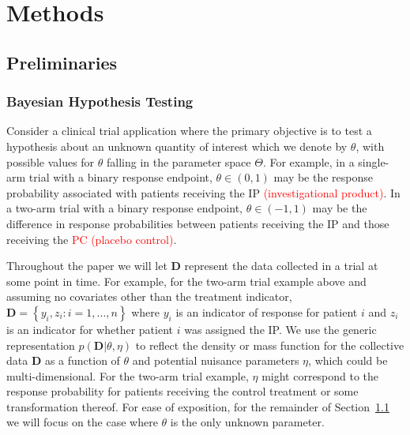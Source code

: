 \documentclass[12pt]{article}
\begin{document}
\section{Methods}\label{sec:methods}

\subsection{Preliminaries}\label{sec:preliminaries}
\subsubsection{Bayesian Hypothesis Testing}
Consider a clinical trial application where the primary objective is to test a hypothesis about an unknown quantity of interest which we denote by $\theta$, with possible values
for $\theta$ falling in the parameter space $\Theta$.
%
For example, in a single-arm trial with a binary response endpoint, $\theta \in (0,1)$ may be the response probability associated with patients receiving the IP \textcolor{red}{(investigational product)}.
%
In a two-arm trial with a binary response endpoint, $\theta \in (-1,1)$ may be the difference in response probabilities between patients receiving the IP and those receiving the \textcolor{red}{PC (placebo control)}.

Throughout the paper we will let $\mathbf{D}$ represent the data collected in a trial at some point in time. 
%
For example, for the two-arm trial example above and assuming no covariates other than the treatment indicator, $\mathbf{D}=\left\{y_i,z_i:i=1,...,n\right\}$ where $y_i$ is an indicator of response for patient $i$ and $z_i$ is an indicator for whether patient $i$ was assigned the IP.
%
We use the generic representation $p(\mathbf{D}|\theta,\eta)$ to reflect the density or mass function for the collective data $\mathbf{D}$ as 
a function of $\theta$ and potential nuisance parameters $\eta$, which could be multi-dimensional.
%
For the two-arm trial example, $\eta$ might correspond to the response probability for patients receiving the control treatment or some transformation thereof. 
For ease of exposition, for the remainder of Section~\ref{sec:preliminaries} we will focus on the case where $\theta$ is the only unknown parameter.
\end{document}
